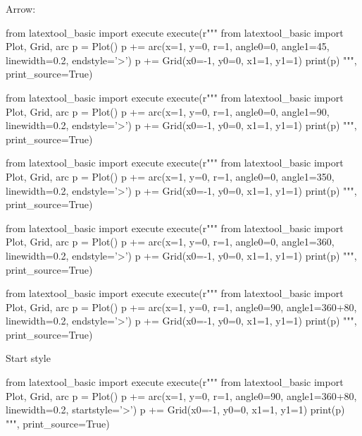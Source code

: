 Arrow:
\begin{python}
from latextool_basic import execute
execute(r"""
from latextool_basic import Plot, Grid, arc
p = Plot()
p += arc(x=1, y=0, r=1, angle0=0, angle1=45, 
        linewidth=0.2, endstyle='>')
p += Grid(x0=-1, y0=0, x1=1, y1=1)
print(p)
""", print_source=True)
\end{python}

\begin{python}
from latextool_basic import execute
execute(r"""
from latextool_basic import Plot, Grid, arc
p = Plot()
p += arc(x=1, y=0, r=1, angle0=0, angle1=90, 
        linewidth=0.2, endstyle='>')
p += Grid(x0=-1, y0=0, x1=1, y1=1)
print(p)
""", print_source=True)
\end{python}




\begin{python}
from latextool_basic import execute
execute(r"""
from latextool_basic import Plot, Grid, arc
p = Plot()
p += arc(x=1, y=0, r=1, angle0=0, angle1=350, 
        linewidth=0.2, endstyle='>')
p += Grid(x0=-1, y0=0, x1=1, y1=1)
print(p)
""", print_source=True)
\end{python}



\begin{python}
from latextool_basic import execute
execute(r"""
from latextool_basic import Plot, Grid, arc
p = Plot()
p += arc(x=1, y=0, r=1, angle0=0, angle1=360, 
        linewidth=0.2, endstyle='>')
p += Grid(x0=-1, y0=0, x1=1, y1=1)
print(p)
""", print_source=True)
\end{python}





\begin{python}
from latextool_basic import execute
execute(r"""
from latextool_basic import Plot, Grid, arc
p = Plot()
p += arc(x=1, y=0, r=1, angle0=90, angle1=360+80, 
        linewidth=0.2, endstyle='>')
p += Grid(x0=-1, y0=0, x1=1, y1=1)
print(p)
""", print_source=True)
\end{python}



Start style
\begin{python}
from latextool_basic import execute
execute(r"""
from latextool_basic import Plot, Grid, arc
p = Plot()
p += arc(x=1, y=0, r=1, angle0=90, angle1=360+80, 
        linewidth=0.2, startstyle='>')
p += Grid(x0=-1, y0=0, x1=1, y1=1)
print(p)
""", print_source=True)
\end{python}



